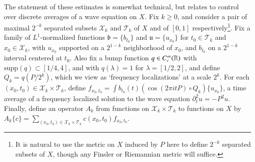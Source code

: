The statement of these estimates is somewhat technical, but relates to control over discrete averages of a wave equation on $X$. Fix $k \geq 0$, and consider a pair of maximal $2^{-k}$ separated subsets $\mathcal{X}_k$ and $\mathcal{T}_k$ of $X$ and of $[0,1]$ respectively\footnote{It is natural to use the metric on $X$ induced by $P$ here to define $2^{-k}$ separated subsets of $X$, though any Finsler or Riemannian metric will suffice.}. Fix a family of $L^1$-normalized functions $\mathfrak{b} = \{ b_{t_0} \}$ and $\mathfrak{u} = \{ u_{x_0} \}$ for $t_0 \in \mathcal{T}_k$ and $x_0 \in \mathcal{X}_k$, with $u_{x_0}$ supported on a $2^{1-k}$ neighborhood of $x_0$, and $b_{t_0}$ on a $2^{1-k}$ interval centered at $t_0$. Also fix a bump function $q \in C_c^\infty(\operatorname{\mathbb{R}})$ with $\text{supp}(q) \subset [1/4,4]$, and with $q(\lambda) = 1$ for $\lambda = [1/2,2]$, and define $Q_k = q(P/2^k)$, which we view as `frequency localizations' at a scale $2^k$. For each $(x_0,t_0) \in \mathcal{X}_k \times \mathcal{T}_k$, define $f_{x_0,t_0} = \int b_{t_0}(t) (\cos(2 \pi i t P) \circ Q_k) \{ u_{x_0} \}$, a time average of a frequency localized solution to the wave equation $\partial_t^2 u = - P^2 u$. Finally, define an operator $A_k$ from functions on $\mathcal{X}_k \times \mathcal{T}_k$ to functions on $X$ by $A_k \{ c \} = \sum\nolimits_{(x_0,t_0) \in \mathcal{X}_k \times \mathcal{T}_k} c(x_0,t_0) f_{x_0,t_0}$.

\vspace{0.5em}

\noindent {}

\vspace{0.4em}

